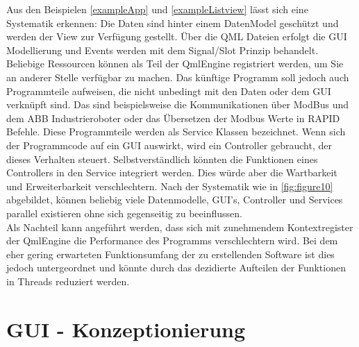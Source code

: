 Aus den Beispielen \ref{exampleApp} und \ref{exampleListview} lässt sich eine Systematik erkennen:
Die Daten sind hinter einem DatenModel geschützt und werden der View zur Verfügung gestellt.
Über die QML Dateien erfolgt die GUI Modellierung und Events werden mit dem Signal/Slot Prinzip behandelt.
Beliebige Ressourcen können als Teil der QmlEngine registriert werden, um Sie an anderer Stelle verfügbar zu machen.
Das künftige Programm soll jedoch auch Programmteile aufweisen, die nicht unbedingt mit den Daten oder dem GUI verknüpft sind.
Das sind beispielsweise die Kommunikationen über ModBus und dem ABB Industrieroboter oder das Übersetzen der Modbus Werte in
RAPID Befehle.
Diese Programmteile werden als Service Klassen bezeichnet.
Wenn sich der Programmcode auf ein GUI auswirkt, wird ein Controller gebraucht, der dieses Verhalten steuert.
Selbstverständlich könnten die Funktionen eines Controllers in den Service integriert werden.
Dies würde aber die Wartbarkeit und Erweiterbarkeit verschlechtern.
Nach der Systematik wie in \ref{fig:figure10} abgebildet, können beliebig viele Datenmodelle, GUI's, Controller und Services
parallel existieren ohne sich gegenseitig zu beeinflussen.\\
Als Nachteil kann angeführt werden, dass sich mit zunehmendem Kontextregister der QmlEngine die Performance des Programms
verschlechtern wird.
Bei dem eher gering erwarteten Funktionsumfang der zu erstellenden Software ist dies jedoch untergeordnet und könnte
durch das dezidierte Aufteilen der Funktionen in Threads reduziert werden.

\section{GUI - Konzeptionierung}

